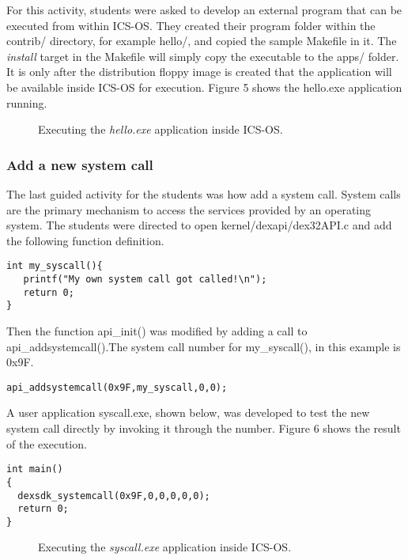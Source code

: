 \documentclass{acm_proc_article-sp}
\begin{document}
For this activity, students were asked to develop an external program that can 
be executed from within ICS-OS. They created their program folder within
the contrib/ directory, for example hello/, and copied the sample Makefile in 
it. The \textit{install} target in the Makefile will simply copy the 
executable to the apps/ folder. It is only after the distribution floppy image 
is created that the application will be available inside ICS-OS for execution. 
Figure 5 shows the hello.exe application running.

\begin{figure}
\centering
{}
\caption{Executing the \textit{hello.exe} application inside ICS-OS.}
\end{figure}
 

\subsubsection{Add a new system call}
The last guided activity for the students was how add a system call.
System calls are the primary mechanism to access the services provided 
by an operating system. The students were directed to open 
kernel/dexapi/dex32API.c and add the following function definition.

\begin{verbatim}
int my_syscall(){
   printf("My own system call got called!\n");
   return 0;
}
\end{verbatim}

Then the function api\_init() was modified by adding a call to 
api\_addsystemcall().The system call number for my\_syscall(), in 
this example is 0x9F.
\begin{verbatim}
api_addsystemcall(0x9F,my_syscall,0,0);
\end{verbatim}

A user application syscall.exe, shown below, was developed to test the 
new system call directly by invoking it through the number. Figure 6 
shows the result of the execution.

\begin{verbatim}
int main()
{
  dexsdk_systemcall(0x9F,0,0,0,0,0);
  return 0;
}
\end{verbatim}

\begin{figure}
\centering
{}
\caption{Executing the \textit{syscall.exe} application inside ICS-OS.}
\end{figure}
\end{document}
